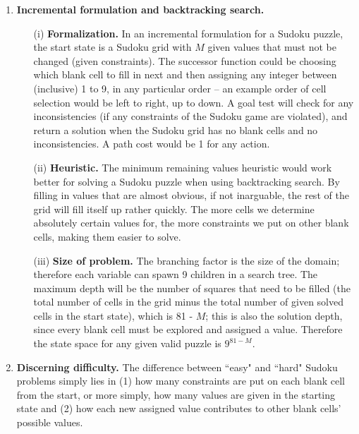 \documentclass[12pt]{article}
\begin{document}
\begin{enumerate}[label=(\alph*)]
    \item \textbf{Incremental formulation and backtracking search.}
        \begin{enumerate}
            \item[(i)] \textbf{Formalization.} In an incremental formulation for a Sudoku puzzle, the start state is a Sudoku grid with $M$ given values that must not be changed (given constraints). The successor function could be choosing which blank cell to fill in next and then assigning any integer between (inclusive) 1 to 9, in any particular order -- an example order of cell selection would be left to right, up to down. A goal test will check for any inconsistencies (if any constraints of the Sudoku game are violated), and return a solution when the Sudoku grid has no blank cells and no inconsistencies. A path cost would be 1 for any action.
            \item[(ii)] \textbf{Heuristic.} The minimum remaining values heuristic would work better for solving a Sudoku puzzle when using backtracking search. By filling in values that are almost obvious, if not inarguable, the rest of the grid will fill itself up rather quickly. The more cells we determine absolutely certain values for, the more constraints we put on other blank cells, making them easier to solve.
            \item[(iii)] \textbf{Size of problem.} The branching factor is the size of the domain; therefore each variable can spawn 9 children in a search tree. The maximum depth will be the number of squares that need to be filled (the total number of cells in the grid minus the total number of given solved cells in the start state), which is 81 - $M$; this is also the solution depth, since every blank cell must be explored and assigned a value. Therefore the state space for any given valid puzzle is $9^{81-M}$. 
        \end{enumerate}
    
    \item \textbf{Discerning difficulty.} The difference between ``easy" and ``hard" Sudoku problems simply lies in (1) how many constraints are put on each blank cell from the start, or more simply, how many values are given in the starting state and (2) how each new assigned value contributes to other blank cells' possible values. 
    

\end{enumerate}
\end{document}
